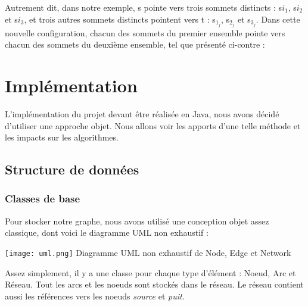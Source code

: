 \documentclass[letterpaper,12pt]{article}
\begin{document}
Autrement dit, dans notre exemple, s pointe vers trois sommets distincts : s$i_1$, s$i_2$ et s$i_3$, et trois autres sommets distincts pointent vers t : s$_1_j$, s$_2_j$ et s$_3_j$. Dans cette nouvelle configuration, chacun des sommets du premier ensemble pointe vers chacun des sommets du deuxième ensemble, tel que présenté ci-contre :

\begin{center}

\end{center}

\section{Implémentation}
L'implémentation du projet devant être réalisée en Java, nous avons décidé d'utiliser une approche objet. Nous allons voir les apports d'une telle méthode et les impacts sur les algorithmes.

\subsection{Structure de données}
\subsubsection{Classes de base}
Pour stocker notre graphe, nous avons utilisé une conception objet assez classique, dont voici le diagramme UML non exhaustif :
\begin{center}
    \texttt{[image: uml.png]}
    Diagramme UML non exhaustif de Node, Edge et Network
\end{center}
Assez simplement, il y a une classe pour chaque type d'élément : Noeud, Arc et Réseau. Tout les arcs et les noeuds sont stockés dans le réseau. Le réseau contient aussi les références vers les noeuds \textit{source} et \textit{puit}.
\end{document}
